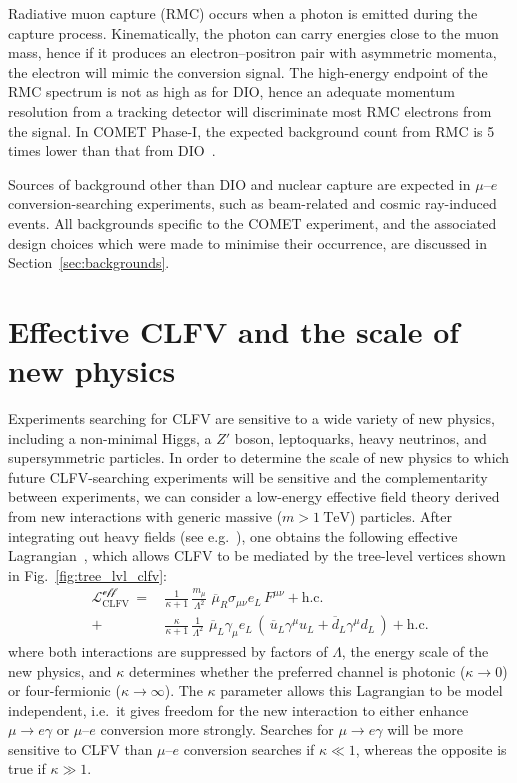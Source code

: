 Radiative muon capture (RMC) occurs when a photon is emitted during the capture
process. Kinematically, the photon can carry energies close to the muon mass,
hence if it produces an electron--positron pair with asymmetric momenta, the
electron will mimic the conversion signal. The high-energy endpoint of the RMC
spectrum is not as high as for DIO, hence an adequate momentum resolution from a
tracking detector will discriminate most RMC electrons from the signal. In COMET
Phase-I, the expected background count from RMC is 5 times lower than that from
DIO~\cite{the_comet_collaboration_comet_2020}.




Sources of background other than DIO and nuclear capture are expected in
$\mu$--$e$ conversion-searching experiments, such as beam-related and cosmic
ray-induced events. All backgrounds specific to the COMET experiment, and the
associated design choices which were made to minimise their occurrence, are
discussed in Section~\ref{sec:backgrounds}.






\section{Effective CLFV and the scale of new physics}
Experiments searching for CLFV are sensitive to a wide variety of new physics,
including a non-minimal Higgs, a $Z'$ boson, leptoquarks, heavy neutrinos, and
supersymmetric particles. 
In order to determine the scale of new physics to which future CLFV-searching
experiments will be sensitive and the complementarity between experiments, we can
consider a low-energy effective field theory derived from new interactions with
generic massive ($m>\SI{1}{\tera\eV}$) particles.
After integrating out heavy fields (see
e.g.~\cite[Chapter~IV]{donoghue_golowich_holstein_2014}), one obtains the
following effective Lagrangian~\cite{DEGOUVEA201375}, which allows CLFV to be
mediated by the tree-level vertices shown in Fig.~\ref{fig:tree_lvl_clfv}:
\begin{align}\label{eq:Leff}
    \mathcal{L^\text{eff}_\mathrm{CLFV}}\,
    =\,
    &\frac{1}{\kappa+1}\, \frac{m_\mu}{\Lambda^2}\,\,
    \overline{\mu}_R \sigma_{\mu\nu} e_L \, F^{\mu\nu} + \text{h.c.}
    \nonumber\\[1em]
    +\,
    &\frac{\kappa}{\kappa+1}\, \frac{1}{\Lambda^2}\,\,
    \overline{\mu}_L \gamma_\mu e_L \,
    (\,
        \overline{u}_L \gamma^\mu u_L + \overline{d}_L \gamma^\mu d_L
    \,) + \text{h.c.}
\end{align}
where both interactions are suppressed by factors of $\Lambda$, the energy scale
of the new physics, and $\kappa$ determines whether the preferred channel is
photonic ($\kappa \rightarrow 0$) or four-fermionic ($\kappa \rightarrow
\infty$). The $\kappa$ parameter allows this Lagrangian to
be model independent, i.e.\ it gives freedom for the new interaction to either
enhance $\mu \rightarrow e\gamma$ or $\mu$--$e$ conversion more strongly.
Searches for $\mu \rightarrow e\gamma$ will be more sensitive to CLFV than
$\mu$--$e$ conversion searches if $\kappa \ll 1$, whereas the opposite is true
if $\kappa \gg 1$.

